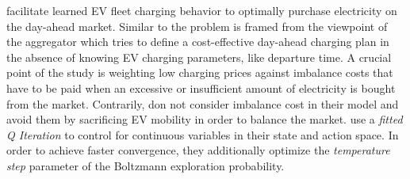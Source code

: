 \documentclass[12pt, article]{article}
\begin{document}
\textcite{vandael15_reinf_learn_heuris_ev_fleet} facilitate learned EV fleet
charging behavior to optimally purchase electricity on the day-ahead market.
Similar to \textcite{kahlen18_elect_vehic_virtual_power_plant_dilem} the problem
is framed from the viewpoint of the aggregator which tries to define a
cost-effective day-ahead charging plan in the absence of knowing EV charging
parameters, like departure time. A crucial point of the study is weighting low
charging prices against imbalance costs that have to be paid when an excessive
or insufficient  amount of electricity is bought from the market. Contrarily,
\textcite{kahlen18_elect_vehic_virtual_power_plant_dilem} don not consider
imbalance cost in their model and avoid them by sacrificing EV mobility in order
to balance the market. \textcite{vandael15_reinf_learn_heuris_ev_fleet} use a
\emph{fitted Q Iteration} to control for continuous variables in their state and
action space. In order to achieve faster convergence, they additionally optimize
the \emph{temperature step} parameter of the Boltzmann exploration probability.
\end{document}
